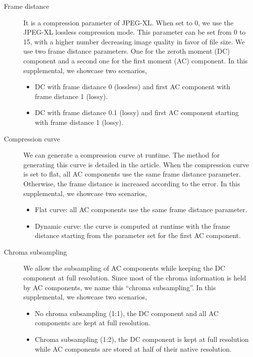 \begin{description}
    \item[Frame distance] It is a compression parameter of JPEG-XL. When set to 0, we use the JPEG-XL lossless compression mode. This parameter can be set from 0 to 15, with a higher number decreasing image quality in favor of file size. We use two frame distance parameters. One for the zeroth moment (DC) component and a second one for the first moment (AC) component. In this supplemental, we showcase two scenarios,
    \begin{itemize}
        \item DC with frame distance 0 (lossless) and first AC component with frame distance 1 (lossy).
        \item DC with frame distance 0.1 (lossy) and first AC component starting with frame distance 1 (lossy).
    \end{itemize}
    \item[Compression curve] We can generate a compression curve at runtime. The method for generating this curve is detailed in the article. When the compression curve is set to flat, all AC components use the same frame distance parameter. Otherwise, the frame distance is increased according to the error. In this supplemental, we showcase two scenarios,
    \begin{itemize}
        \item Flat curve: all AC components use the same frame distance parameter.
        \item Dynamic curve: the curve is computed at runtime with the frame distance starting from the parameter set for the first AC component.
    \end{itemize}
    \item[Chroma subsampling] We allow the subsampling of AC components while keeping the DC component at full resolution. Since most of the chroma information is held by AC components, we name this ``chroma subsampling''. In this supplemental, we showcase two scenarios,
        \begin{itemize}
            \item No chroma subsampling (1:1), the DC component and all AC components are kept at full resolution.
            \item Chroma subsampling (1:2), the DC component is kept at full resolution while AC components are stored at half of their native resolution.
        \end{itemize}
\end{description}

